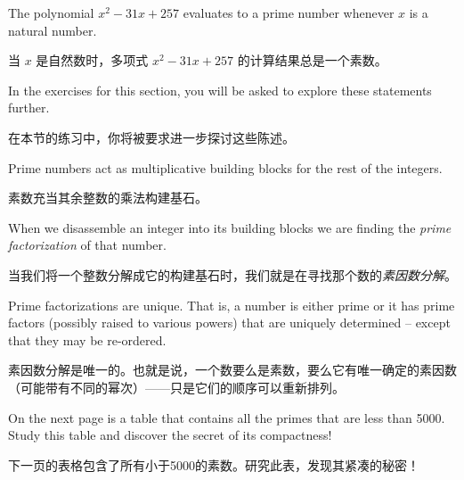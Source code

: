 \begin{conj} \label{conj:poly}
The polynomial $x^2-31x+257$ evaluates to a prime number
whenever $x$ is a natural number.


当 $x$ 是自然数时，多项式 $x^2-31x+257$ 的计算结果总是一个素数。
\end{conj}

In the exercises for this section, you will be asked to
explore these statements further.

在本节的练习中，你将被要求进一步探讨这些陈述。

Prime numbers act as multiplicative building blocks for the rest of
the integers.

素数充当其余整数的乘法构建基石。

When we disassemble an integer into its building blocks
we are finding the \emph{prime factorization} 
of that number.

当我们将一个整数分解成它的构建基石时，我们就是在寻找那个数的\emph{素因数分解}。

Prime
factorizations are unique.  That is, a number is either prime or it
has prime factors (possibly raised to various powers) that are
uniquely determined -- except that they may be re-ordered.

素因数分解是唯一的。也就是说，一个数要么是素数，要么它有唯一确定的素因数（可能带有不同的幂次）——只是它们的顺序可以重新排列。

On the next page
is a table that contains all the primes that are less than 5000.
Study this table and discover the secret of its compactness!

下一页的表格包含了所有小于5000的素数。研究此表，发现其紧凑的秘密！

\newpage


